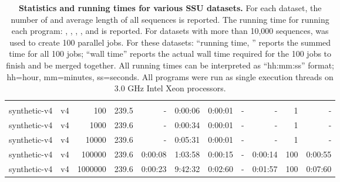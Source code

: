 \begin{table}[hb]
\begin{center}
\begin{tabular}{llrr|rrrrr|rr}
& & & & & & & & & \\
synthetic-v4    & v4       &     100 &  239.5 &         - &   0:00:06 &   0:00:01 &         - &         - &   1 &         - \\%
synthetic-v4    & v4       &    1000 &  239.6 &         - &   0:00:34 &   0:00:01 &         - &         - &   1 &         - \\%
synthetic-v4    & v4       &   10000 &  239.6 &         - &   0:05:31 &   0:00:01 &         - &         - &   1 &         - \\%
synthetic-v4    & v4       &  100000 &  239.6 &   0:00:08 &   1:03:58 &   0:00:15 &         - &   0:00:14 & 100 &   0:00:55 \\%
synthetic-v4    & v4       & 1000000 &  239.6 &   0:00:23 &   9:42:32 &   0:02:60 &         - &   0:01:57 & 100 &   0:07:60 \\%
\end{tabular}
\caption{\textbf{Statistics and running times for various SSU
    datasets.} For each dataset, the number of and average length of all
  sequences is reported. The running time for running each program:
  , , , ,
and  is reported. For datasets with more than 10,000
sequences,  was used to create 100 parallel
 jobs. For these datasets: ``running time, ''
reports the summed time for all 100 jobs; ``wall time'' reports the
actual wall time required for the 100 jobs to finish and be merged
together. All running times can be interpreted as ``hh:mm:ss'' format;
hh=hour, mm=minutes, ss=seconds. All programs were run as single
execution threads on 3.0 GHz Intel Xeon processors.}
\end{center}
\label{tbl:ttimes}
\end{table}

